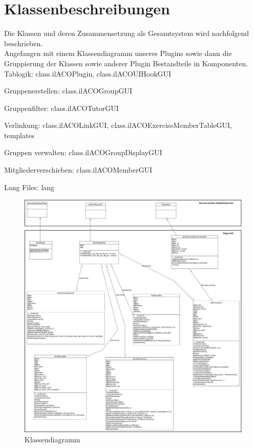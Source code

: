 \chapter{Klassenbeschreibungen}
\minitoc

Die Klassen und deren Zusammensetzung als Gesamtsystem wird
nachfolgend beschrieben. 
\\

Angefangen mit einem Klassendiagramm unseres Plugins sowie 
dann die Gruppierung der Klassen sowie anderer Plugin Bestandteile in
Komponenten.		
\\

Tablogik: class.ilACOPlugin, class.ilACOUIHookGUI 

Gruppenerstellen: class.ilACOGroupGUI

Gruppenfilter: class.ilACOTutorGUI

Verlinkung: class.ilACOLinkGUI, class.ilACOExerciseMemberTableGUI, templates

Gruppen verwalten: class.ilACOGroupDisplayGUI

Mitgliederverschieben: class.ilACOMemberGUI

Lang Files: lang


\begin{figure}
	\centering
	\includegraphics[width=1\textwidth]{img/klassendiagramm.jpg}
	\caption{Klassendiagramm}
\end{figure}

